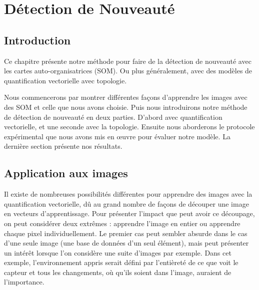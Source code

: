 
\chapter{Détection de Nouveauté}
	\minitoc
	\newpage




			
	\section{Introduction}

	Ce chapitre présente notre méthode pour faire de la détection de nouveauté avec les cartes auto-organisatrices (SOM). Ou plus généralement, avec des modèles de quantification vectorielle avec topologie.

	Nous commencerons par montrer différentes façons d'apprendre les images avec des SOM et celle que nous avons choisie. Puis nous introduirons notre méthode de détection de nouveauté en deux parties. D'abord avec quantification vectorielle, et une seconde avec la topologie. Ensuite nous aborderons le protocole expérimental que nous avons mis en œuvre pour évaluer notre modèle. La dernière section présente nos résultats.

	\section{Application aux images}\label{sec:images}

	Il existe de nombreuses possibilités différentes pour apprendre des images avec la quantification vectorielle, dû au grand nombre de façons de découper une image en vecteurs d'apprentissage. Pour présenter l'impact que peut avoir ce découpage, on peut considérer deux extrêmes : apprendre l'image en entier ou apprendre chaque pixel individuellement. Le premier cas peut sembler absurde dans le cas d'une seule image (une base de données d'un seul élément), mais peut présenter un intérêt lorsque l'on considère une suite d'images par exemple. Dans cet exemple, l'environnement appris serait défini par l'entièreté de ce que voit le capteur et tous les changements, où qu'ils soient dans l'image, auraient de l'importance.

